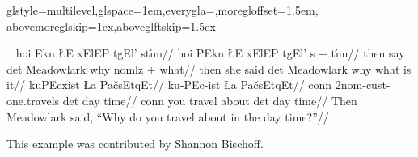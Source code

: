%
   {glstyle=multilevel,glspace=1em,everygla=\ips,moregloffset=1.5em,
   abovemoreglskip=1ex,aboveglftskip=1.5ex}

\framedisplay~
\ex[lingstyle=ips-gloss]
\begingl
\gla hoi Ekn {\L}E {x\W}ElEP t{g\W}El' st{\'\i}m//
\gla hoi {\mroot}PEkn {\L}E {x\W}ElEP t{g\W}El' {s + \mroot t\'\i m}//
\glb then {\mroot}say det Meadowlark why
   {nomlz + \mroot what}//
\glb then {she said} det Meadowlark why {what is it}//
\moregl
{} {kuPEcx\W ist} {\L a} Pa{\v c}sEtqEt//
 ku-PEc-ist {\L}a Pa{\v c}sEtqEt//
\glb conn 2nom-cust-{\mroot}one.travels det {day time}//
\glb conn {you travel about} det {day time}//
\glft Then Meadowlark said, ``Why do you travel about in the day
time?''//
\endgl
\xe
\endframedisplay

\noindent This example was contributed by Shannon Bischoff.

%
%
%
%
%
%
%

